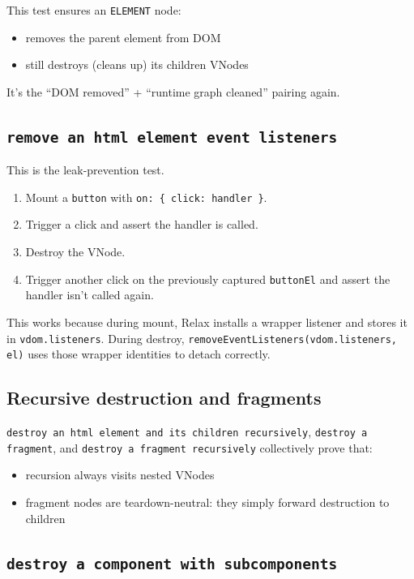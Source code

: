 This test ensures an \texttt{ELEMENT} node:

\begin{itemize}
  \item removes the parent element from DOM
  \item still destroys (cleans up) its children VNodes
\end{itemize}

It's the ``DOM removed'' + ``runtime graph cleaned'' pairing again.

\subsection{\texttt{remove an html element event listeners}}

This is the leak-prevention test.

\begin{enumerate}
  \item Mount a \texttt{button} with \texttt{on: \{ click: handler \}}.
  \item Trigger a click and assert the handler is called.
  \item Destroy the VNode.
  \item Trigger another click on the previously captured \texttt{buttonEl} and assert the handler isn't called again.
\end{enumerate}

This works because during mount, Relax installs a wrapper listener and stores it in \texttt{vdom.listeners}. During destroy, \texttt{removeEventListeners(vdom.listeners, el)} uses those wrapper identities to detach correctly.

\subsection{Recursive destruction and fragments}

	\texttt{destroy an html element and its children recursively}, \texttt{destroy a fragment}, and \texttt{destroy a fragment recursively} collectively prove that:

\begin{itemize}
  \item recursion always visits nested VNodes
  \item fragment nodes are teardown-neutral: they simply forward destruction to children
\end{itemize}

\subsection{\texttt{destroy a component with subcomponents}}


